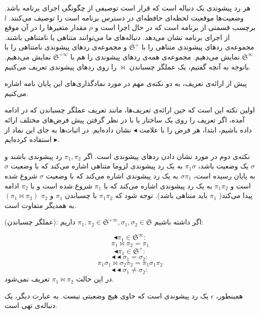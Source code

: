 هر رد پیشوندی یک دنباله است که قرار است توصیفی از چگونگی اجرای برنامه باشد. وضعیت‌ها موقعیت لحظه‌ای حافظه‌ا‌ی در دسترس برنامه است را توصیف می‌کنند. $l$ برچسب قسمتی از برنامه‌ است که در حال اجرا است و $\rho$ مقدار متغیر‌ها را در آن موقع از اجرای برنامه نشان می‌دهد. دنباله‌های ما می‌توانند متناهی یا نامتناهی باشند. مجموعه‌ی ردهای پیشوندی‌ متناهی را با $\mathfrak{S^+}$ و مجموعه‌ی ردهای پیشوندی نامتناهی را با  $\mathfrak{S^\infty}$ نمایش می‌دهیم. مجموعه‌ی همه‌ی ردهای پیشوندی را هم با $\mathfrak{S^{+\infty}}$ نمایش می‌دهیم. 
با‌توجه به آنچه گفتیم، یک عملگر چسباندن $\Join$ را روی ردهای پیشوندی تعریف می‌کنیم. 

پیش از ارائه‌ی تعریف، به دو نکته‌ی مهم در مورد نمادگذاری‌های این پایان نامه اشاره می‌کنیم.

اولین نکته این است که حین ارائه‌ی تعریف‌ها، مانند تعریف عملگر چسباندن که در ادامه آمده، اگر تعریف را روی یک ساختار یا با در نظر گرفتن پیش فرض‌های مختلف ارائه داده باشیم، ابتدا، هر فرض را با علامت 
$\blacktriangleleft$
نشان داده‌ایم. در اثبات‌ها به جای این نماد از 
$\blacktriangleright$
استفاده کرده‌ایم. 

نکته‌ی دوم در مورد نشان دادن ردهای پیشوندی است. اگر $\pi_1,\pi_2$ رد پیشوندی باشند و $\sigma$ یک وضعیت باشد، $\pi_1\sigma$ به یک رد پیشوندی لزوما متناهی اشاره می‌کند که با وضعیت $\sigma$ به پایان رسیده است،
$\sigma\pi_1$
به یک رد پیشوندی اشاره می‌کند که با وضعیت $\sigma$ شروع شده است و $\pi_1\pi_2$ به یک رد پیشوندی اشاره می‌کند که با $\pi_1$ شروع شده است و با $\pi_2$ ادامه پیدا می‌کند( $\pi_1$ باید متناهی باشد). توجه شود که $\pi_1\pi_2$ با چسباندن $\pi_1$ و $\pi_2$ $(\pi_1 \Join \pi_2)$به همدیگر متفاوت است.

\begin{defn}
	(عملگر چسباندن): اگر داشته باشیم 
	$\pi_1 , \pi_2 \in \mathfrak{S^{+\infty}}  , \sigma_1 ,\sigma_2 \in \mathfrak{S}$
	داریم:\\
	\begin{center}
		
		$$\blacktriangleleft \pi_1 \in \mathfrak{S}^\infty:$$
		$$\pi_1 \Join \pi_2 = \pi_1$$
		$$\blacktriangleleft \pi_1 \in \mathfrak{S}^+:$$
		$$\blacktriangleleft \blacktriangleleft \sigma_1 = \sigma_2:$$
		$$\pi_1\sigma_1 \Join \sigma_2 \pi_2 = \pi_1 \sigma_1 \pi_2$$
		$$\blacktriangleleft \blacktriangleleft \sigma_1 \neq \sigma_2:$$
		در این حالت 
		$\pi_1 \Join \pi_2$
		تعریف نمی‌شود.
	\end{center}
\end{defn}
همینطور، $\epsilon$ یک رد پیشوندی است که حاوی هیچ وضعیتی نیست. به عبارت دیگر، یک دنباله‌ی تهی است.


